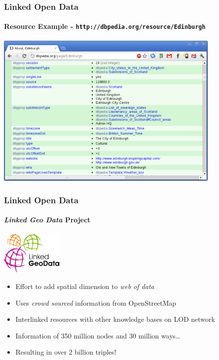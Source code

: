 \documentclass{beamer}
\begin{document}
\begin{frame}
\frametitle{Linked Open Data}
\framesubtitle{Resource Example - \texttt{http://dbpedia.org/resource/Edinburgh}}

\begin{center}
\includegraphics[width=110mm]{images/edinburgh-dbpedia.pdf}
\end{center}

\end{frame}

\begin{frame}
\frametitle{Linked Open Data}
\framesubtitle{\emph{Linked Geo Data} Project}

\begin{center}
\includegraphics[width=30mm]{images/lgdlogo.pdf}
\end{center}

\begin{itemize}
\item Effort to add spatial dimension to \emph{web of data}
\item Uses \emph{crowd sourced} information from OpenStreetMap
\item Interlinked resources with other knowledge bases on LOD network
\bigskip
\item Information of 350 million nodes and 30 million ways\ldots
\item Resulting in over 2 billion triples!
\end{itemize}

\end{frame}
\end{document}

